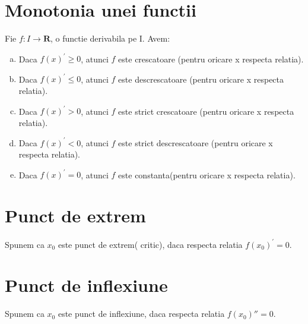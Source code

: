 \documentclass[11pt]{article}
\begin{document}
\section*{Monotonia unei functii}
    \begin{flushleft}
        \qquad Fie $f:I \to \mathbf{R}$, o functie derivabila pe I. Avem:
        \begin{enumerate}[(a).]
            \item   Daca $f(x)^\prime \geq 0$, atunci $f$ este crescatoare (pentru oricare x respecta
            relatia).
            \item   Daca $f(x)^\prime \leq 0$, atunci $f$ este descrescatoare (pentru oricare x respecta 
                    relatia).
            \item   Daca $f(x)^\prime > 0$, atunci $f$ este strict crescatoare (pentru oricare x respecta
            relatia).
            \item    Daca $f(x)^\prime < 0$, atunci $f$ este strict descrescatoare (pentru oricare x
            respecta relatia).
            \item   Daca $f(x)^\prime = 0$, atunci $f$ este constanta(pentru oricare x respecta relatia).
        \end{enumerate}
    \end{flushleft}

\section*{Punct de extrem}
    \begin{flushleft}
        \qquad Spunem ca $x_0$ este punct de extrem( critic), daca respecta relatia $f(x_0)^\prime = 0$.
    \end{flushleft}
    
\section*{Punct de inflexiune}
    \begin{flushleft}
        \qquad Spunem ca $x_0$ este punct de inflexiune, daca respecta relatia $f(x_0)'' = 0$.
    \end{flushleft}
\end{document}
